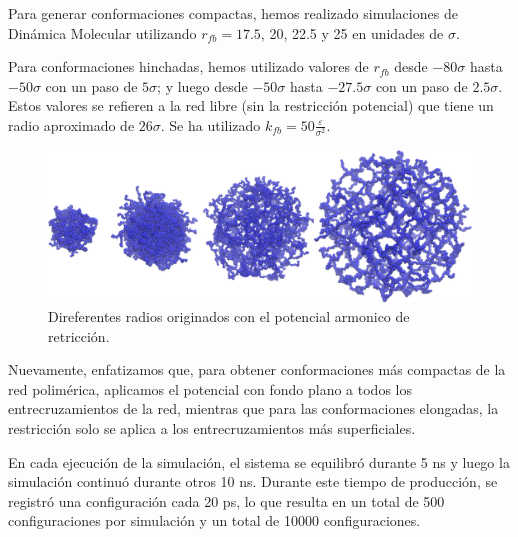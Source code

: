 Para generar conformaciones compactas, hemos realizado simulaciones de Din\'amica Molecular utilizando $r_{fb} = 17.5$, 20, 22.5 y 25 en unidades de $\sigma$.

Para conformaciones hinchadas, hemos utilizado valores de $r_{fb}$ desde $-80\sigma$ hasta $-50\sigma$ con un paso de $5\sigma$; y luego desde $-50\sigma$ hasta $-27.5\sigma$ con un paso de $2.5\sigma$. Estos valores se refieren a la red libre (sin la restricci\'on potencial) que tiene un radio aproximado de $26\sigma$.
Se ha utilizado $k_{fb} = 50\frac{\varepsilon}{\sigma^2} $.



\begin{figure}[!ht]
	\centering
	\includegraphics[width=0.5\linewidth]{Figures/graph-anexos/geles_radios.png}
	\caption{Direferentes radios originados con el potencial armonico de retricción. }
	\label{fig:anexo:geles}
\end{figure}


Nuevamente, enfatizamos que, para obtener conformaciones m\'as compactas de la red polim\'erica, aplicamos el potencial con fondo plano a todos los entrecruzamientos de la red, mientras que para las conformaciones elongadas, la restricci\'on solo se aplica a los entrecruzamientos m\'as superficiales.

En cada ejecuci\'on de la simulaci\'on, el sistema se equilibr\'o durante 5 ns y luego la simulaci\'on continu\'o durante otros 10 ns. Durante este tiempo de producci\'on, se registr\'o una configuraci\'on cada 20 ps, lo que resulta en un total de 500 configuraciones por simulaci\'on y un total de 10000 configuraciones.
